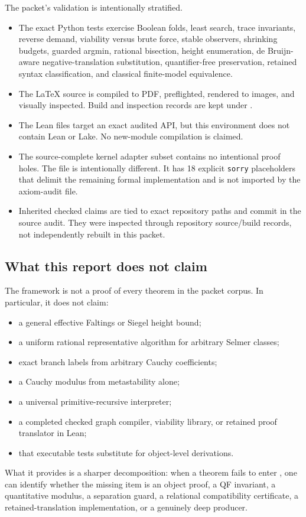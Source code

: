 The packet's validation is intentionally stratified.
\begin{itemize}
  \item The exact Python tests exercise Boolean folds, least search, trace invariants, reverse demand, viability versus brute force, stable observers, shrinking budgets, guarded argmin, rational bisection, height enumeration, de Bruijn-aware negative-translation substitution, quantifier-free preservation, retained syntax classification, and classical finite-model equivalence.
  \item The LaTeX source is compiled to PDF, preflighted, rendered to images, and visually inspected.  Build and inspection records are kept under .
  \item The Lean files target an exact audited API, but this environment does not contain Lean or Lake.  No new-module compilation is claimed.
  \item The source-complete kernel adapter subset contains no intentional proof holes.  The file  is intentionally different.  It has 18 explicit \texttt{sorry} placeholders that delimit the remaining formal implementation and is not imported by the axiom-audit file.
  \item Inherited checked claims are tied to exact repository paths and commit in the source audit.  They were inspected through repository source/build records, not independently rebuilt in this packet.
\end{itemize}

\subsection{What this report does not claim}

The framework is not a proof of every theorem in the packet corpus.  In particular, it does not claim:
\begin{itemize}
  \item a general effective Faltings or Siegel height bound;
  \item a uniform rational representative algorithm for arbitrary Selmer classes;
  \item exact branch labels from arbitrary Cauchy coefficients;
  \item a Cauchy modulus from metastability alone;
  \item a universal primitive-recursive interpreter;
  \item a completed checked graph compiler, viability library, or retained proof translator in Lean;
  \item that executable tests substitute for object-level derivations.
\end{itemize}
What it provides is a sharper decomposition: when a theorem fails to enter \iPRA, one can identify whether the missing item is an object proof, a QF invariant, a quantitative modulus, a separation guard, a relational compatibility certificate, a retained-translation implementation, or a genuinely deep producer.

